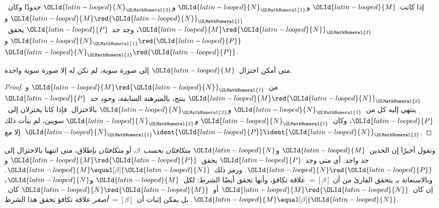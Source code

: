 \documentclass[../../../include/open-logic-section]{subfiles}
\begin{document}

\begin{thm}
إذا كانت~${\OLId{latin-looped}{M}}$ و${\OLId{latin-looped}{N}}_{\OLMathNumeral{1}}$ و${\OLId{latin-looped}{N}}_{\OLMathNumeral{2}}$ حدودًا وكان~${\OLId{latin-looped}{M}} \red {\OLId{latin-looped}{N}}_{\OLMathNumeral{1}}$ و${\OLId{latin-looped}{M}} \red {\OLId{latin-looped}{N}}_{\OLMathNumeral{2}}$،
وجد حد~${\OLId{latin-looped}{P}}$ يحقق~${\OLId{latin-looped}{N}}_{\OLMathNumeral{1}} \red {\OLId{latin-looped}{P}}$ و${\OLId{latin-looped}{N}}_{\OLMathNumeral{2}} \red {\OLId{latin-looped}{P}}$.
\end{thm}

\begin{cor}
متى أمكن اختزال~${\OLId{latin-looped}{M}}$ إلى صورة سوية، لم تكن له إلا صورة سوية واحدة.
\end{cor}

\begin{proof}
من~${\OLId{latin-looped}{M}} \red {\OLId{latin-looped}{N}}_{\OLMathNumeral{1}}$ و${\OLId{latin-looped}{M}} \red {\OLId{latin-looped}{N}}_{\OLMathNumeral{2}}$ ينتج، بالمبرهنة السابقة،
وجود حد~${\OLId{latin-looped}{P}}$ ينتهي إليه كل من~${\OLId{latin-looped}{N}}_{\OLMathNumeral{1}}$ و${\OLId{latin-looped}{N}}_{\OLMathNumeral{2}}$ بالاختزال.
فإذا كانا يختزلان إلى~${\OLId{latin-looped}{P}}$، وكان~${\OLId{latin-looped}{N}}_{\OLMathNumeral{1}}$ و${\OLId{latin-looped}{N}}_{\OLMathNumeral{2}}$ سويين،
لم يتأت ذلك إلا مع~${\OLId{latin-looped}{N}}_{\OLMathNumeral{1}} \ident {\OLId{latin-looped}{P}} \ident {\OLId{latin-looped}{N}}_{\OLMathNumeral{2}}$.
\end{proof}

ونقول أخيرًا إن الحدين~${\OLId{latin-looped}{M}}$ و${\OLId{latin-looped}{N}}$ \emph{متكافئان بحسب~$\beta$}،
أو \emph{متكافئان} بإطلاق، متى انتهيا بالاختزال إلى حد واحد:
أي متى وجد~${\OLId{latin-looped}{P}}$ يحقق~${\OLId{latin-looped}{M}} \red {\OLId{latin-looped}{P}}$ و${\OLId{latin-looped}{N}} \red {\OLId{latin-looped}{P}}$.
ورمز ذلك~${\OLId{latin-looped}{M}} \equal[\beta] {\OLId{latin-looped}{N}}$.
وبالاستعانة بـ يتحقق القارئ من أن
$\equal[\beta]$ علاقة تكافؤ، وأنها تحقق أيضًا الشرط:
لكل~${\OLId{latin-looped}{M}}$ و${\OLId{latin-looped}{N}}$، إن كان~${\OLId{latin-looped}{M}} \red {\OLId{latin-looped}{N}}$ أو~${\OLId{latin-looped}{N}} \red {\OLId{latin-looped}{M}}$
كان~${\OLId{latin-looped}{M}} \equal[\beta] {\OLId{latin-looped}{N}}$.
بل يمكن إثبات أن~$\equal[\beta]$ \emph{أصغر} علاقة تكافؤ
تحقق هذا الشرط.
\end{document}
